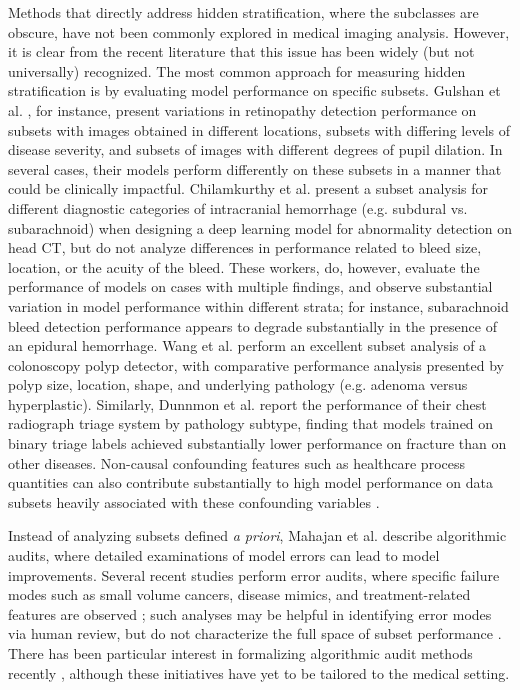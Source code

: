\documentclass[sigconf,anonymous,review]{acmart}
\begin{document}
Methods that directly address hidden stratification, where the subclasses are obscure, have not been commonly explored in medical imaging analysis.  
However, it is clear from the recent literature that this issue has been widely (but not universally) recognized.  
The most common approach for measuring hidden stratification is by evaluating model performance on specific subsets.
Gulshan et al. \citep{Gulshan2016-we}, for instance, present variations in retinopathy detection performance on subsets with images obtained in different locations, subsets with differing levels of disease severity, and subsets of images with different degrees of pupil dilation.  
In several cases, their models perform differently on these subsets in a manner that could be clinically impactful.  
Chilamkurthy et al. \citep{Chilamkurthy2018-op}  present a subset analysis for different diagnostic categories of intracranial hemorrhage (e.g. subdural vs. subarachnoid) when designing a deep learning model for abnormality detection on head CT, but do not analyze differences in  performance related to bleed size, location, or the acuity of the bleed. 
 These workers, do, however, evaluate the performance of models on cases with multiple findings, and observe substantial variation in model performance within different strata; for instance, subarachnoid bleed detection performance appears to degrade substantially in the presence of an epidural hemorrhage.  
Wang et al. \citep{Wang2019-jr} perform an excellent subset analysis of a colonoscopy polyp detector, with comparative performance analysis presented by polyp size, location, shape, and underlying pathology (e.g. adenoma versus hyperplastic).  
 Similarly, Dunnmon et al. \citep{Dunnmon2019-rr} report the performance of their chest radiograph triage system by pathology subtype, finding that models trained on binary triage labels achieved substantially lower performance on fracture than on other diseases.   
Non-causal confounding features such as healthcare process quantities can also contribute substantially to high model performance on data subsets heavily associated with these confounding variables \citep{Winkler2019-fw, Badgeley2019-zi, Agniel2018-qp, Zech2018-xq}.

Instead of analyzing subsets defined \textit{a priori}, Mahajan et al. \citep{Mahajan2019-yi} describe algorithmic audits, where detailed examinations of model errors can lead to model improvements.
 Several recent studies perform error audits, where specific failure modes such as small volume cancers, disease mimics, and treatment-related features are observed \citep{Campanella2019-qs, Wang2019-jr}; such analyses may be helpful in identifying error modes via human review, but do not characterize the full space of subset performance \citep{Selbst2017-gz}.  
 There has been particular interest in formalizing algorithmic audit methods recently \citep{raji2020closing}, although these initiatives have yet to be tailored to the medical setting. 
\end{document}
